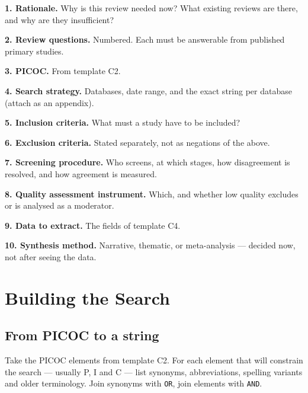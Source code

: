 \begin{templatebox}
\textbf{1. Rationale.} Why is this review needed now? What existing reviews
are there, and why are they insufficient?

\noindent\textbf{2. Review questions.} Numbered. Each must be answerable from
published primary studies.

\noindent\textbf{3. PICOC.} From template C2.

\noindent\textbf{4. Search strategy.} Databases, date range, and the exact
string per database (attach as an appendix).

\noindent\textbf{5. Inclusion criteria.} What must a study have to be included?

\noindent\textbf{6. Exclusion criteria.} Stated separately, not as negations of
the above.

\noindent\textbf{7. Screening procedure.} Who screens, at which stages, how
disagreement is resolved, and how agreement is measured.

\noindent\textbf{8. Quality assessment instrument.} Which, and whether low
quality excludes or is analysed as a moderator.

\noindent\textbf{9. Data to extract.} The fields of template C4.

\noindent\textbf{10. Synthesis method.} Narrative, thematic, or meta-analysis
--- decided now, not after seeing the data.
\end{templatebox}

\section{Building the Search}

\subsection{From PICOC to a string}

Take the PICOC elements from template C2. For each element that will constrain
the search --- usually P, I and C --- list synonyms, abbreviations, spelling
variants and older terminology. Join synonyms with \texttt{OR}, join elements
with \texttt{AND}.

